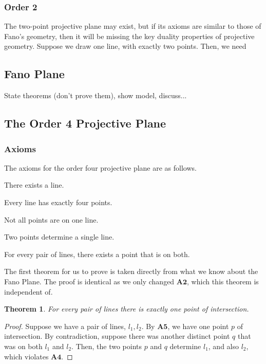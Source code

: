 \documentclass{article}
\newenvironment{axioms}
 {\enumerate[label=\textbf{A\arabic*.}, ref=A\arabic*]}
 {\endenumerate}
\newtheorem{theorem}{Theorem}[section]
\begin{document}
\subsubsection{Order 2}
The two-point projective plane may exist, but if its axioms are similar to those of Fano's geometry, then it will be missing the key duality properties of projective geometry. Suppose we draw one line, with exactly two points. Then, we need

\subsection{Fano Plane}
State theorems (don't prove them), show model, discuss...
\subsection{The Order 4 Projective Plane}
\subsubsection{Axioms}
The axioms for the order four projective plane are as follows.
\begin{axioms}
  \item There exists a line.
  \item Every line has exactly four points.
  \item Not all points are on one line.
  \item Two points determine a single line.
  \item For every pair of lines, there exists a point that is on both.
\end{axioms}

The first theorem for us to prove is taken directly from what we know about the Fano Plane. The proof is identical as we only changed $\mathbf{A2}$, which this theorem is independent of.

\begin{theorem}
For every pair of lines there is exactly one point of intersection.
\end{theorem}

\begin{proof}
Suppose we have a pair of lines, $l_1, l_2$. By $\mathbf{A5}$, we have one point $p$ of intersection. By contradiction, suppose there was another distinct point $q$ that was on both $l_1$ and $l_2$. Then, the two points $p$ and $q$ determine $l_1$, and also $l_2$, which violates $\mathbf{A4}$.
\end{proof}
\end{document}
